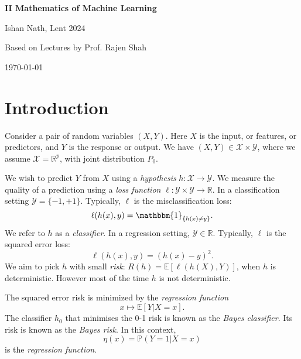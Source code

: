 \documentclass[12pt]{article}
\begin{document}
\hypersetup{pageanchor=false}
\begin{titlepage}
	\begin{center}
		\vspace*{1em}
		\Huge
		\textbf{II Mathematics of Machine Learning}

		\vspace{1em}
		\large
		Ishan Nath, Lent 2024

		\vspace{1.5em}

		\Large

		Based on Lectures by Prof. Rajen Shah

		\vspace{1em}

		\large
		\today
	\end{center}
	
\end{titlepage}
\hypersetup{pageanchor=true}

\tableofcontents

\newpage

\section{Introduction}
\label{sec:into}

Consider a pair of random variables $(X, Y)$. Here $X$ is the input, or features, or predictors, and $Y$ is the response or output. We have $(X, Y) \in \mathcal{X} \times \mathcal{Y}$, where we assume $\mathcal{X} = \mathbb{R}^p$, with joint distribution $P_0$.

We wish to predict $Y$ from $X$ using a \emph{hypothesis} $h : \mathcal{X} \to \mathcal{Y}$. We measure the quality of a prediction using a \emph{loss function} $\ell : \mathcal{Y} \times \mathcal{Y} \to \mathbb{R}$. In a classification setting $\mathcal{Y} = \{-1, +1\}$. Typically, $\ell $ is the misclassification loss:
\[
	\ell(h(x), y) = \mathbbm{1}_{\{h(x) \neq y\}}.
\]
We refer to $h$ as a \emph{classifier}. In a regression setting, $\mathcal{Y} \in \mathbb{R}$. Typically, $\ell $ is the squared error loss:
\[
\ell(h(x), y) = (h(x) - y)^2.
\]
We aim to pick $h$ with small \emph{risk}: $R(h) = \mathbb{E}[\ell(h(X), Y)]$, when $h$ is deterministic. However most of the time $h$ is not deterministic.

The squared error risk is minimized by the \emph{regression function}
\[
x \mapsto \mathbb{E}[Y|X = x].
\]
The classifier $h_0$ that minimises the 0-1 risk is known as the \emph{Bayes classifier}. Its risk is known as the \emph{Bayes risk}. In this context,
\[
\eta(x) = \mathbb{P}(Y = 1 |X = x)
\]
is the \emph{regression function}.
\end{document}
